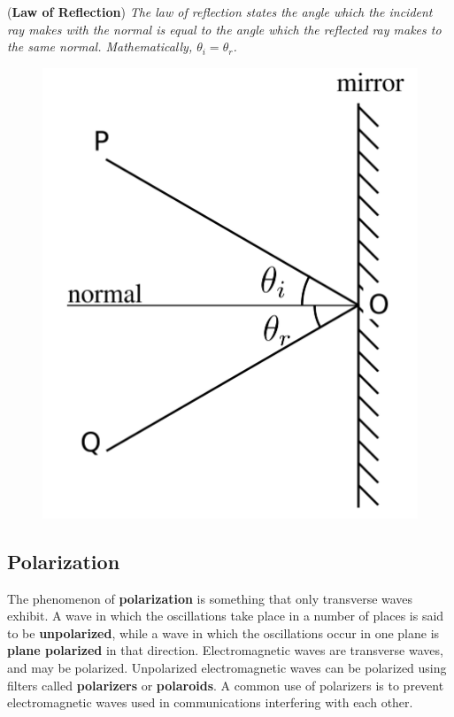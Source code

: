 \begin{definition}{(\textbf{Law of Reflection})}
\textit{The law of reflection states the angle which the incident ray makes with the normal is equal to the angle which the reflected ray makes to the same normal. Mathematically, $\theta_i = \theta_r$.}
\begin{figure}[h!]
    \centering
    \includegraphics[scale=0.09]{notes/images/Law-Of-Reflection.JPG}
\end{figure}
\FloatBarrier

\end{definition}

\subsection{Polarization}

The phenomenon of \textbf{polarization} is something that only transverse waves exhibit. A wave in which the oscillations take place in a number of places is said to be \textbf{unpolarized}, while a wave in which the oscillations occur in one plane is \textbf{plane polarized} in that direction. Electromagnetic waves are transverse waves, and may be polarized. Unpolarized electromagnetic waves can be polarized using filters called \textbf{polarizers} or \textbf{polaroids}. A common use of polarizers is to prevent electromagnetic waves used in communications interfering with each other. 


